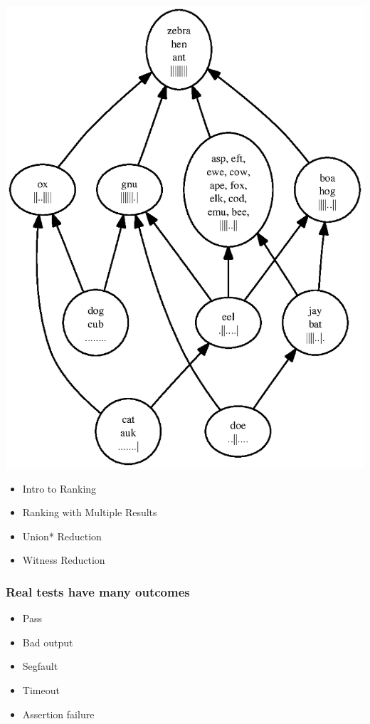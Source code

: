 \documentclass[svgnames,14pt]{beamer}
\theoremstyle{definition}
\begin{document}
\begin{frame}
\centerline{\includegraphics[height=\textheight]{rank1b.ps}}
\end{frame}

\begin{frame}
\begin{itemize}
\frametitle{Overview}
\item<1> Intro to Ranking
\item<1-2> Ranking with Multiple Results
\item<1> Union* Reduction
\item<1> Witness Reduction
\end{itemize}
\end{frame}


\begin{frame}
\frametitle{Real tests have many outcomes}
\begin{itemize}
\item Pass
\item Bad output
\item Segfault
\item Timeout
\item Assertion failure
\end{itemize}
\end{frame}
\end{document}
